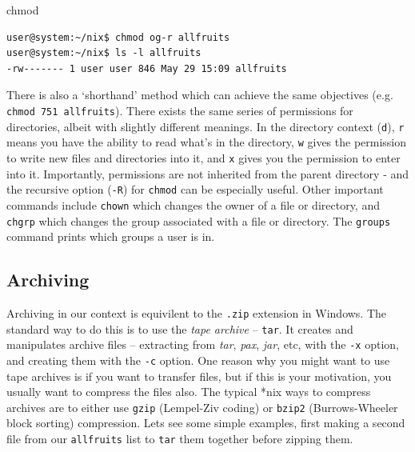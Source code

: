 \documentclass[11pt]{article}
\begin{document}
\begin{listing}[H]
\caption{chmod}\vspace{-0.1in}
\begin{verbatim}
user@system:~/nix$ chmod og-r allfruits
user@system:~/nix$ ls -l allfruits
-rw------- 1 user user 846 May 29 15:09 allfruits
\end{verbatim}
\end{listing}

There is also a `shorthand' method which can achieve the same objectives (e.g. \texttt{chmod 751 allfruits}). There exists the same series of permissions for directories, albeit with slightly different meanings.  In the directory context (\texttt{d}), \texttt{r} means you have the ability to read what's in the directory, \texttt{w} gives the permission to write new files and directories into it, and \texttt{x} gives you the permission to enter into it. Importantly,  permissions are not inherited from the parent directory - and the recursive option (\texttt{-R}) for \texttt{chmod} can be especially useful. Other important commands include  \texttt{chown} which changes the owner of a file or directory, and \texttt{chgrp} which changes the group associated with a file or directory. The \texttt{groups} command prints which groups a user is in.

\subsection{Archiving}

Archiving in our context is equivilent to the \texttt{.zip} extension in Windows. The standard way to do this is to use the \emph{tape archive} -- \texttt{tar}. It creates and manipulates archive files -- extracting from \emph{tar}, \emph{pax}, \emph{jar}, etc, with the \texttt{-x} option, and creating them with the \texttt{-c} option. One reason why you might want to use tape archives is if you want to transfer files, but if this is your motivation, you usually want to compress the files also. The typical *nix ways to compress archives are to either use \texttt{gzip} (Lempel-Ziv coding) or \texttt{bzip2} (Burrows-Wheeler block sorting) compression. Lets see some simple examples, first making a second file from our \texttt{allfruits} list to \texttt{tar} them together before zipping them.\\
\end{document}
